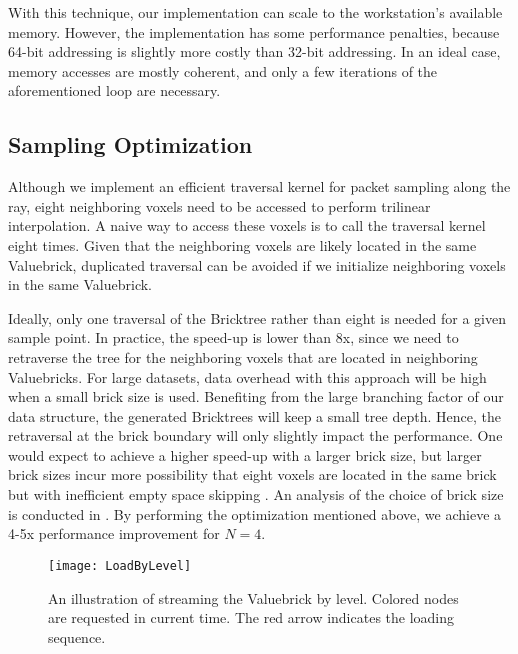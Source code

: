 With this technique, our implementation can scale to the workstation's available
memory. However, the implementation has some performance penalties, because 64-bit addressing is slightly more costly than 32-bit addressing. In an ideal case, memory accesses are mostly coherent, and only a few iterations of the aforementioned loop are necessary.


\subsection{Sampling Optimization}
Although we implement an efficient traversal kernel for packet sampling along the ray,
eight neighboring voxels need to be accessed to perform trilinear interpolation.
A naive way to access these voxels is to call the traversal kernel eight
times. Given that the neighboring voxels are likely located in the same Valuebrick,
duplicated traversal can be avoided if we initialize neighboring voxels in the same
Valuebrick. 

Ideally, only one traversal of the Bricktree rather than eight is needed for a given 
sample point. In practice, the speed-up is lower than 8x, since we need to
retraverse the tree for the neighboring voxels that are located in neighboring
Valuebricks. 
For large datasets, 
data overhead with this approach will be high when a small brick size is used. Benefiting 
from the large branching factor of our data structure, the generated Bricktrees will keep
a small tree depth. Hence, the retraversal at the brick boundary will only slightly impact the performance. 
One would expect to achieve a higher speed-up with a larger brick size, but larger
brick sizes incur more possibility that eight voxels are located in the same brick
but with inefficient empty space skipping
\cite{fogal2013analysis}. An analysis of the choice of brick size is conducted in
. 
By performing the optimization mentioned above, we achieve a 4-5x
performance improvement for $N=4$. 

\begin{figure}[h]
  \centering
    \texttt{[image: LoadByLevel]}
    \caption{\label{fig:loadbylevel}An illustration of streaming the Valuebrick by level. Colored nodes are requested in current time. The red arrow indicates the loading sequence.}
    \vspace{-1em}
\end{figure}




